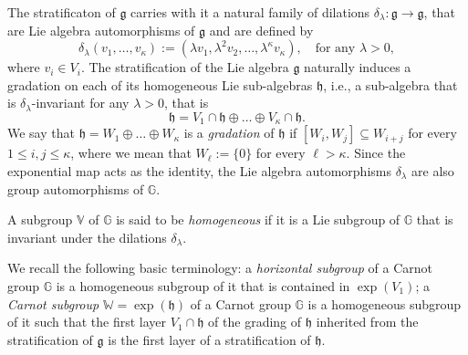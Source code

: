 \documentclass[10pt, a4paper,
oneside, headinclude,footinclude]{scrartcl}
\begin{document}
The stratificaton of $\mathfrak{g}$ carries with it a natural family of dilations $\delta_\lambda :\mathfrak{g}\to \mathfrak{g}$, that are Lie algebra automorphisms of $\mathfrak{g}$ and are defined by
\begin{equation}
     \delta_\lambda (v_1,\dots , v_\kappa):=(\lambda v_1,\lambda^2 v_2,\dots , \lambda^\kappa v_\kappa), \quad \text{for any $\lambda>0$},
     \nonumber
\end{equation}
where $v_i\in V_i$. The stratification of the Lie algebra $\mathfrak{g}$  naturally induces a gradation on each of its homogeneous Lie sub-algebras $\mathfrak{h}$, i.e., a sub-algebra that is $\delta_{\lambda}$-invariant for any $\lambda>0$, that is
\begin{equation}
    \mathfrak{h}=V_1\cap \mathfrak{h}\oplus\ldots\oplus V_\kappa\cap \mathfrak{h}.
    \label{eq:intr1}
\end{equation}
We say that $\mathfrak h=W_1\oplus\dots\oplus W_{\kappa}$ is a {\em gradation} of $\mathfrak h$ if $[W_i,W_j]\subseteq W_{i+j}$ for every $1\leq i,j\leq \kappa$, where we mean that $W_\ell:=\{0\}$ for every $\ell > \kappa$.
Since the exponential map acts as the identity, the Lie algebra automorphisms $\delta_\lambda$ are also group automorphisms of $\mathbb{G}$.

\begin{definizione}\label{homsub}
A subgroup $\mathbb V$ of $\mathbb{G}$ is said to be \emph{homogeneous} if it is a Lie subgroup of $\mathbb{G}$ that is invariant under the dilations $\delta_\lambda$.
\end{definizione}

We recall the following basic terminology: a {\em horizontal subgroup} of a Carnot group $\mathbb G$ is a homogeneous subgroup of it that is contained in $\exp(V_1)$; a {\em Carnot subgroup} $\mathbb W=\exp(\mathfrak h)$ of a Carnot group $\mathbb G$ is a homogeneous subgroup of it such that the first layer $V_1\cap\mathfrak h$ of the grading of $\mathfrak h$ inherited from the stratification of $\mathfrak g$ is the first layer of a stratification of $\mathfrak h$.
\end{document}
